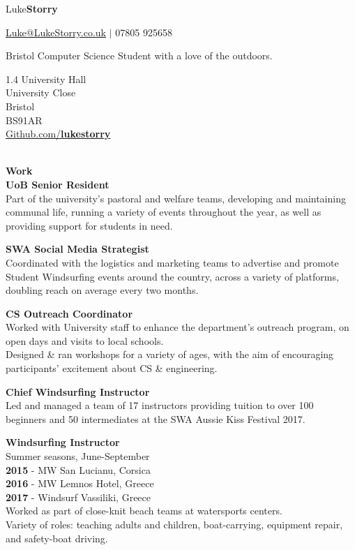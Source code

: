 \documentclass[10pt]{article}
\newcommand{\bold}[1]{\textbf{\textcolor{dark}{#1}}}
\newcommand{\sect}[1]{{\color{dark}\LARGE\textbf{#1}}\vspace{0.2em}\\}
\newcommand{\xx}[2]{{\large\bold{#1}}\\{#2}\vspace{0.5em}}
\begin{document}
\begin{center}
{\color{dark}\Huge Luke\textbf{Storry}}
\hspace{0.1em}

{\large \href{mailto:Luke@LukeStorry.co.uk}{Luke@LukeStorry.co.uk}  $|$  07805 925658} 

Bristol Computer Science Student with a love of the outdoors.\\
\vspace{-0.5em}
{\color{dark}\hrulefill}
\end{center}
%
%
%
%
%
%
\begin{minipage}[t]{0.33\textwidth} %
1.4 University Hall\\University Close\\Bristol\\BS91AR
\vspace{0.5em}\\
\href{https://github.com/lukestorry}{Github.com/\bold{\textcolor{dark}{lukestorry}}} \\
\\
\raggedright
\sect{Work}
\xx{UoB Senior Resident}
{Part of the university's pastoral and welfare teams, developing and maintaining communal life, running a variety of events throughout the year, as well as providing support for students in need.}

\xx{SWA Social Media Strategist}
{Coordinated with the logistics and marketing teams to advertise and promote Student Windsurfing events around the country, across a variety of platforms, doubling reach on average every two months.}

\xx{CS Outreach Coordinator}{Worked with University staff to enhance the department's outreach program, on open days and visits to local schools. \\
Designed \& ran workshops for a variety of ages, with the aim of encouraging participants' excitement about CS \& engineering.}

\xx{Chief Windsurfing Instructor}
{Led and managed a team of 17 instructors providing tuition to over 100 beginners and 50 intermediates at the SWA Aussie Kiss Festival 2017.}

\xx{Windsurfing Instructor}
{Summer seasons, June-September\\
\bold{2015} - MW San Lucianu, Corsica\\
\bold{2016} - MW Lemnos Hotel, Greece\\
\bold{2017} - Windsurf Vassiliki, Greece\\
Worked as part of close-knit beach teams at watersports centers.\\
Variety of roles: teaching adults and children, boat-carrying, equipment repair, and safety-boat driving.}


\end{minipage}
\end{document}
